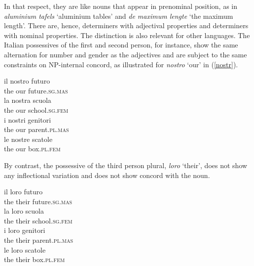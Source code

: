 \documentclass[output=paper
	        ,collection
	        ,collectionchapter
 	        ,biblatex
                ,babelshorthands
                ,newtxmath
                ,draftmode
                ,colorlinks, citecolor=brown
]{langscibook}
\begin{document}
\noindent
In that respect, they are like nouns that appear in prenominal position,
as in \emph{aluminium tafels} `aluminium tables' and \emph{de maximum lengte}
`the maximum length'. There are, hence, determiners with adjectival 
properties and determiners with nominal properties.   
The distinction is also relevant for other languages. The Italian 
possessives of the first and second person, for instance, 
show the same alternation for number and gender as the adjectives
and are subject to the same constraints on NP-internal concord, as illustrated 
for \emph{nostro} `our' in (\ref{nostr}). 

\begin{exe}  
\ex\label{nostr} 
\begin{xlist}
\ex 
\gll  il nostro futuro \\
      the our future.\textsc{sg.mas} \\ 
\ex 
\gll  la nostra scuola  \\
      the our school.\textsc{sg.fem} \\ 
\ex 
\gll  i nostri genitori \\
      the our parent.\textsc{pl.mas} \\ 
\ex 
\gll  le nostre scatole \\
      the our box.\textsc{pl.fem} \\ 
\end{xlist}
\end{exe} 

\noindent
By contrast, the possessive of the third person plural, \emph{loro} `their',
does not show any inflectional variation and does not show concord with the noun.

\begin{exe} 
\ex 
\begin{xlist}
\ex 
\gll  il loro futuro \\   
      the their future.\textsc{sg.mas}  \\ 
\ex 
\gll  la loro scuola  \\   
      the their school.\textsc{sg.fem}   \\ 
\ex 
\gll  i loro genitori \\   
      the their parent.\textsc{pl.mas} \\ 
\ex 
\gll  le loro scatole \\   
      the their box.\textsc{pl.fem} \\ 
\end{xlist} 
\end{exe}
\end{document}
